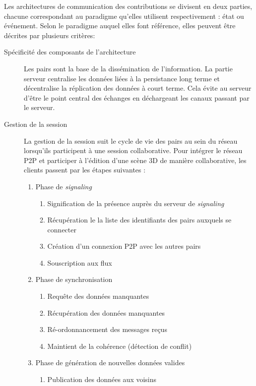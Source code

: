 Les architectures de communication des contributions se divisent en deux parties, 
chacune correspondant au paradigme qu'elles utilisent respectivement : état ou 
événement. Selon le paradigme auquel elles font référence, elles peuvent 
être décrites par plusieurs critères:
\begin{description}
	\item[Spécificité des composants de l'architecture] Les pairs sont la base de la 
	dissémination de l'information. La partie serveur 
	centralise les données liées à la persistance long  terme et
	décentralise la réplication des données à court terme. Cela évite au 
	serveur 
	d'être le point central des échanges en déchargeant les canaux passant par le 
	serveur.
	\item [Gestion de la session] 
	La gestion de la session suit le cycle de vie des pairs au sein du réseau 
	lorsqu'ils participent à une session collaborative. 
	Pour intégrer le réseau \gls{P2P} et participer à l'édition d'une scène \gls{3D} de 
	manière collaborative, les clients passent par les étapes suivantes :
		\begin{enumerate}
		\item Phase de \textit{signaling}
		\label{phase1signaling}
		\begin{enumerate}
			\item Signification de la présence auprès du serveur de \textit{signaling}
			\item Récupération le la liste des identifiants des pairs auxquels se 
			connecter
			\item Création d'un connexion \gls{P2P} avec les autres pairs
			\item Souscription aux flux
			
		\end{enumerate}
		\item Phase de synchronisation
		\label{phase2sync}
		\begin{enumerate}
			\item Requête des données manquantes
			\item Récupération des données manquantes
			\item Ré-ordonnancement des messages reçus
			\item Maintient de la cohérence (détection de conflit)
		\end{enumerate}
		
		\item Phase de génération de nouvelles données valides 
		\label{phase3gen}
		\begin{enumerate}
			\item Publication des données aux voisins
		\end{enumerate}
		

\end{enumerate}
\end{description}
